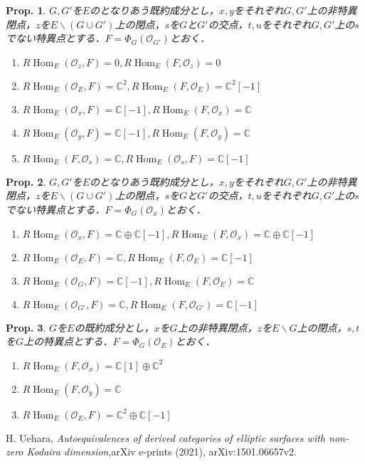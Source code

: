 \documentclass[uplatex,a4paper,11pt,dvipdfmx]{jsarticle}
\theoremstyle{mystyle} %
\newtheorem{proposition}{Prop.}[section]
\DeclareMathOperator{\Hom}{Hom}
\begin{document}
\begin{proposition}
	$G, G'$を$E$のとなりあう既約成分とし，$x,y$をそれぞれ$G, G'$上の非特異閉点，$z$を$E \backslash (G \cup G')$上の閉点，$s$を$G$と$G'$の交点，$t, u$をそれぞれ$G, G'$上の$s$でない特異点とする．$F = \Phi_G(\mathcal{O}_{G'})$とおく．
	\begin{enumerate}
		\item $R\Hom_E(\mathcal{O}_z, F) = 0, R\Hom_E(F,\mathcal{O}_z)=0$
		\item $R\Hom_E(\mathcal{O}_E, F) = \mathbb{C}^2, R\Hom_E(F,\mathcal{O}_E)=\mathbb{C}^2[-1]$
		\item $R\Hom_E(\mathcal{O}_x, F) = \mathbb{C}[-1], R\Hom_E(F,\mathcal{O}_x)=\mathbb{C}$
		\item $R\Hom_E(\mathcal{O}_y, F) = \mathbb{C}[-1], R\Hom_E(F,\mathcal{O}_y)=\mathbb{C}$
		\item $R\Hom_E(F, \mathcal{O}_s) =\mathbb{C}, R\Hom_E( \mathcal{O}_s, F) =\mathbb{C}[-1]$
	\end{enumerate}
\end{proposition}
\begin{proposition}
	$G, G'$を$E$のとなりあう既約成分とし，$x,y$をそれぞれ$G, G'$上の非特異閉点，$z$を$E \backslash (G \cup G')$上の閉点，$s$を$G$と$G'$の交点，$t, u$をそれぞれ$G, G'$上の$s$でない特異点とする．$F = \Phi_G(\mathcal{O}_x)$とおく．
	\begin{enumerate}
		\item $R\Hom_E(\mathcal{O}_x, F) = \mathbb{C} \oplus \mathbb{C}[-1],R\Hom_E(F, \mathcal{O}_x) = \mathbb{C} \oplus \mathbb{C}[-1]$
		\item $R\Hom_E(\mathcal{O}_E, F) = \mathbb{C} ,R\Hom_E(F, \mathcal{O}_E) = \mathbb{C}[-1]$
		\item $R\Hom_E(\mathcal{O}_G, F) = \mathbb{C}[-1] ,R\Hom_E(F, \mathcal{O}_E) = \mathbb{C}$
		\item $R\Hom_E(\mathcal{O}_{G'}, F) = \mathbb{C} ,R\Hom_E(F, \mathcal{O}_{G'}) = \mathbb{C}[-1]$
	\end{enumerate}
\end{proposition}


\begin{proposition}
	$G$を$E$の既約成分とし，$x$を$G$上の非特異閉点，$z$を$E \backslash G$上の閉点，$s,t$を$G$上の特異点とする．$F = \Phi_G(\mathcal{O}_E)$とおく．
	\begin{enumerate}
		\item $R\Hom_E(F,\mathcal{O}_x) = \mathbb{C}[1] \oplus \mathbb{C}^2$
		\item $R\Hom_E(F,\mathcal{O}_y) = \mathbb{C}$
		\item $R\Hom_E(\mathcal{O}_E, F) = \mathbb{C}^2\oplus\mathbb{C}[-1]$

	\end{enumerate}
\end{proposition}
\begin{thebibliography}{99}
	 H. Uehara, \textit{Autoequivalences of derived categories of elliptic surfaces with non-zero Kodaira dimension},arXiv e-prints (2021), arXiv:1501.06657v2.
\end{thebibliography}
\end{document}
